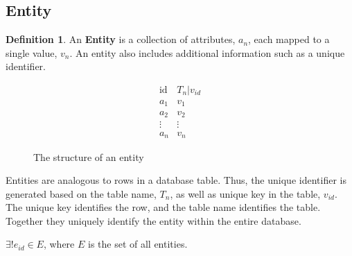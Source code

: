 \documentclass[12pt,letterpaper,oneside,draft]{report}
\theoremstyle{definition}
\newtheorem{defn}{Definition}
\begin{document}
			\subsection{Entity}
				\begin{defn}
					An \textbf{Entity} is a collection of attributes, $a_n$, each mapped to a single value, $v_n$.  An entity also includes additional information such as a unique identifier.

					\begin{figure}[!ht]
						\centering
						\[
							\begin{array}{ll}
								\mathrm{id} & T_n|v_{id} \\
								a_1 & v_1 \\
								a_2 & v_2 \\
								\vdots & \vdots \\
								a_n & v_n
							\end{array}
						\]
						\caption{The structure of an entity}
						\label{fig:entity-rep}
					\end{figure}

					Entities are analogous to rows in a database table.  Thus, the unique identifier is generated based on the table name, $T_n$, as well as unique key in the table, $v_{id}$.  The unique key identifies the row, and the table name identifies the table.  Together they uniquely identify the entity within the entire database.

					$\exists! e_{id} \in E$, where $E$ is the set of all entities.
				\end{defn}
\end{document}
